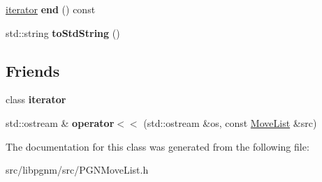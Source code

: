 \begin{DoxyCompactItemize}
\item 
\hypertarget{classpgn_1_1MoveList_a14a21251ba1a08e8934ec204c9558c82}{
\hyperlink{classpgn_1_1MoveList_1_1iterator}{iterator} {\bfseries end} () const }
\label{classpgn_1_1MoveList_a14a21251ba1a08e8934ec204c9558c82}

\item 
\hypertarget{classpgn_1_1MoveList_a97c94457913b294e15d492dd2a2e8c19}{
std::string {\bfseries toStdString} ()}
\label{classpgn_1_1MoveList_a97c94457913b294e15d492dd2a2e8c19}

\end{DoxyCompactItemize}
\subsection*{Friends}
\begin{DoxyCompactItemize}
\item 
\hypertarget{classpgn_1_1MoveList_a67171474c4da6cc8efe0c7fafefd2b2d}{
class {\bfseries iterator}}
\label{classpgn_1_1MoveList_a67171474c4da6cc8efe0c7fafefd2b2d}

\item 
\hypertarget{classpgn_1_1MoveList_a0d05100a7283d96193fddbfc7624fc9c}{
std::ostream \& {\bfseries operator$<$$<$} (std::ostream \&os, const \hyperlink{classpgn_1_1MoveList}{MoveList} \&src)}
\label{classpgn_1_1MoveList_a0d05100a7283d96193fddbfc7624fc9c}

\end{DoxyCompactItemize}


The documentation for this class was generated from the following file:\begin{DoxyCompactItemize}
\item 
src/libpgnm/src/PGNMoveList.h\end{DoxyCompactItemize}
